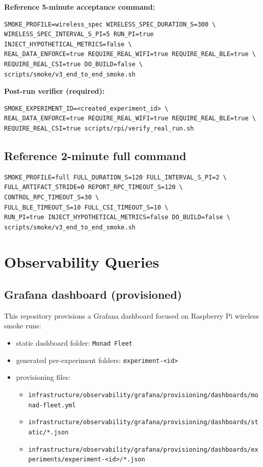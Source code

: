 \documentclass[11pt,a4paper]{article}
\begin{document}
\textbf{Reference 5-minute acceptance command:}
\begin{verbatim}
SMOKE_PROFILE=wireless_spec WIRELESS_SPEC_DURATION_S=300 \
WIRELESS_SPEC_INTERVAL_S_PI=5 RUN_PI=true INJECT_HYPOTHETICAL_METRICS=false \
REAL_DATA_ENFORCE=true REQUIRE_REAL_WIFI=true REQUIRE_REAL_BLE=true \
REQUIRE_REAL_CSI=true DO_BUILD=false \
scripts/smoke/v3_end_to_end_smoke.sh
\end{verbatim}

\textbf{Post-run verifier (required):}
\begin{verbatim}
SMOKE_EXPERIMENT_ID=<created_experiment_id> \
REAL_DATA_ENFORCE=true REQUIRE_REAL_WIFI=true REQUIRE_REAL_BLE=true \
REQUIRE_REAL_CSI=true scripts/rpi/verify_real_run.sh
\end{verbatim}

\subsection{Reference 2-minute full command}
\begin{verbatim}
SMOKE_PROFILE=full FULL_DURATION_S=120 FULL_INTERVAL_S_PI=2 \
FULL_ARTIFACT_STRIDE=0 REPORT_RPC_TIMEOUT_S=120 \
CONTROL_RPC_TIMEOUT_S=30 \
FULL_BLE_TIMEOUT_S=10 FULL_CSI_TIMEOUT_S=10 \
RUN_PI=true INJECT_HYPOTHETICAL_METRICS=false DO_BUILD=false \
scripts/smoke/v3_end_to_end_smoke.sh
\end{verbatim}

\section{Observability Queries}
\subsection{Grafana dashboard (provisioned)}
This repository provisions a Grafana dashboard focused on Raspberry Pi wireless smoke runs:
\begin{itemize}
  \item static dashboard folder: \texttt{Monad Fleet}
  \item generated per-experiment folders: \texttt{experiment-\textless id\textgreater}
  \item provisioning files:
  \begin{itemize}
    \item \texttt{infrastructure/observability/grafana/provisioning/dashboards/monad-fleet.yml}
    \item \texttt{infrastructure/observability/grafana/provisioning/dashboards/static/*.json}
    \item \texttt{infrastructure/observability/grafana/provisioning/dashboards/experiments/experiment-\textless id\textgreater/*.json}
  \end{itemize}
\end{itemize}
\end{document}
